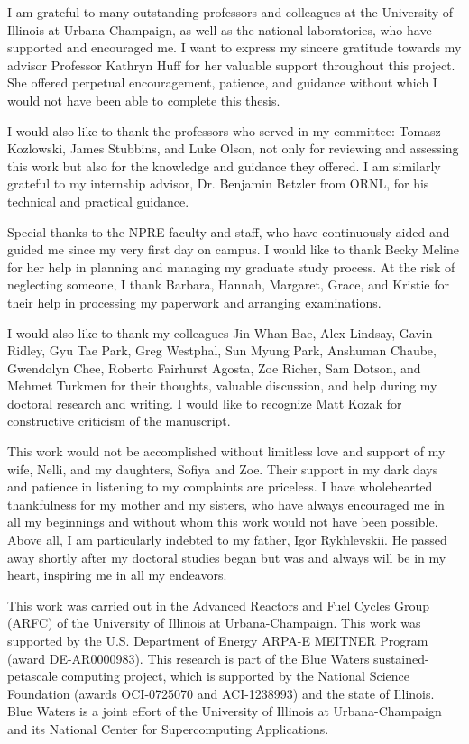 I am grateful to many outstanding professors and colleagues at the 
University of Illinois at Urbana-Champaign, as well as the national 
laboratories, who have supported and encouraged me. I want to express my 
sincere gratitude towards my advisor Professor Kathryn Huff
for her valuable support throughout this project. She offered perpetual 
encouragement, patience, and guidance without which I would not have been able 
to complete this thesis. 

I would also like to thank the professors who served in my committee: Tomasz 
Kozlowski, James Stubbins, and Luke Olson, not only for reviewing and 
assessing this work but also for the knowledge and guidance they offered. I 
am similarly grateful to my internship advisor, Dr. Benjamin Betzler from 
ORNL, for his technical and practical guidance.

Special thanks to the NPRE faculty and staff, who have continuously aided and 
guided me since my very first day on campus. I would like to thank Becky 
Meline for her help in planning and managing my graduate study process. At the 
risk of neglecting someone, I thank Barbara, Hannah, Margaret, Grace, and 
Kristie for their help in processing my paperwork and arranging examinations. 

I would also like to thank my colleagues Jin Whan Bae, Alex Lindsay, Gavin 
Ridley, Gyu Tae Park, Greg Westphal, Sun Myung Park, Anshuman Chaube, 
Gwendolyn Chee, Roberto Fairhurst Agosta, Zoe Richer, Sam Dotson, and Mehmet 
Turkmen for their thoughts, valuable discussion, and help during my doctoral 
research and writing. I would like to recognize Matt Kozak for constructive 
criticism of the manuscript. 

This work would not be accomplished without limitless love and support of my 
wife, Nelli, and my daughters, Sofiya and Zoe. Their support in my dark days 
and patience in listening to my complaints are priceless. I have wholehearted 
thankfulness for my mother and my sisters, who have always encouraged me in 
all my beginnings and without whom this work would not have been possible. 
Above all, I am particularly indebted to my father, Igor Rykhlevskii. He 
passed away shortly after my doctoral studies began but was and always will be 
in my heart, inspiring me in all my endeavors.

This work was carried out in the Advanced Reactors and Fuel Cycles Group 
(ARFC) of the University of Illinois at Urbana-Champaign. This work was 
supported by the U.S. Department of Energy ARPA-E MEITNER Program (award 
DE-AR0000983). This research is part of the Blue Waters sustained-petascale 
computing project, which is supported by the National Science Foundation 
(awards OCI-0725070 and ACI-1238993) and the state of Illinois. Blue Waters is 
a joint effort of the University of Illinois at Urbana-Champaign and its 
National Center for Supercomputing Applications.